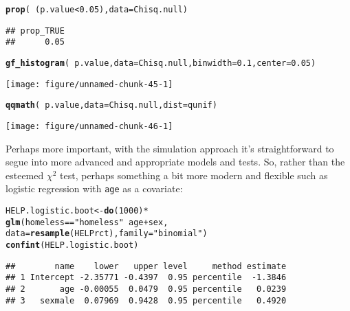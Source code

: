 \documentclass[11pt]{article}\usepackage[]{graphicx}\usepackage[]{color}
\makeatletter
\def\maxwidth{ %
  \ifdim\Gin@nat@width>\linewidth
    \linewidth
  \else
    \Gin@nat@width
  \fi
}
\newcommand{\hlnum}[1]{\textcolor[rgb]{0.686,0.059,0.569}{#1}}%
\newcommand{\hlstr}[1]{\textcolor[rgb]{0.192,0.494,0.8}{#1}}%
\newcommand{\hlopt}[1]{\textcolor[rgb]{0,0,0}{#1}}%
\newcommand{\hlstd}[1]{\textcolor[rgb]{0.345,0.345,0.345}{#1}}%
\newcommand{\hlkwb}[1]{\textcolor[rgb]{0.69,0.353,0.396}{#1}}%
\newcommand{\hlkwc}[1]{\textcolor[rgb]{0.333,0.667,0.333}{#1}}%
\newcommand{\hlkwd}[1]{\textcolor[rgb]{0.737,0.353,0.396}{\textbf{#1}}}%
\newenvironment{kframe}{%
 \def\at@end@of@kframe{}%
 \ifinner\ifhmode%
  \def\at@end@of@kframe{\end{minipage}}%
  \begin{minipage}{\columnwidth}%
 \fi\fi%
 \def\FrameCommand##1{\hskip\@totalleftmargin \hskip-\fboxsep
 \colorbox{shadecolor}{##1}\hskip-\fboxsep
     \hskip-\linewidth \hskip-\@totalleftmargin \hskip\columnwidth}%
 \MakeFramed {\advance\hsize-\width
   \@totalleftmargin\z@ \linewidth\hsize
   \@setminipage}}%
 {\par\unskip\endMakeFramed%
 \at@end@of@kframe}
\newenvironment{knitrout}{}{} %
\makeatother
\begin{document}
\begin{knitrout}
\color{fgcolor}\begin{kframe}
\begin{alltt}
\hlkwd{prop}\hlstd{(}\hlopt{~} \hlstd{(p.value} \hlopt{<} \hlnum{0.05}\hlstd{),} \hlkwc{data} \hlstd{= Chisq.null)}
\end{alltt}
\begin{verbatim}
## prop_TRUE 
##      0.05
\end{verbatim}
\begin{alltt}
\hlkwd{gf_histogram}\hlstd{(}\hlopt{~} \hlstd{p.value,} \hlkwc{data} \hlstd{= Chisq.null,} \hlkwc{binwidth} \hlstd{=} \hlnum{0.1}\hlstd{,} \hlkwc{center} \hlstd{=} \hlnum{0.05}\hlstd{)}
\end{alltt}
\end{kframe}

{\centering \texttt{[image: figure/unnamed-chunk-45-1]} 

}



\end{knitrout}
\begin{knitrout}
\color{fgcolor}\begin{kframe}
\begin{alltt}
\hlkwd{qqmath}\hlstd{(}\hlopt{~} \hlstd{p.value,} \hlkwc{data} \hlstd{= Chisq.null,} \hlkwc{dist} \hlstd{= qunif)}
\end{alltt}
\end{kframe}

{\centering \texttt{[image: figure/unnamed-chunk-46-1]} 

}



\end{knitrout}

Perhaps more important, with the simulation approach it's straightforward to segue into more advanced and appropriate models and tests.  So, rather than the esteemed $\chi^2$ test, perhaps something a bit more modern and flexible such as logistic regression with \texttt{age} as a covariate:
\begin{knitrout}
\color{fgcolor}\begin{kframe}
\begin{alltt}
\hlstd{HELP.logistic.boot} \hlkwb{<-} \hlkwd{do}\hlstd{(}\hlnum{1000}\hlstd{)} \hlopt{*}
   \hlkwd{glm}\hlstd{(homeless}\hlopt{==}\hlstr{"homeless"} \hlopt{~} \hlstd{age} \hlopt{+} \hlstd{sex,}
     \hlkwc{data} \hlstd{=} \hlkwd{resample}\hlstd{(HELPrct),} \hlkwc{family} \hlstd{=} \hlstr{"binomial"}\hlstd{)}
\hlkwd{confint}\hlstd{(HELP.logistic.boot)}
\end{alltt}
\begin{verbatim}
##        name    lower   upper level     method estimate
## 1 Intercept -2.35771 -0.4397  0.95 percentile  -1.3846
## 2       age -0.00055  0.0479  0.95 percentile   0.0239
## 3   sexmale  0.07969  0.9428  0.95 percentile   0.4920
\end{verbatim}
\end{kframe}
\end{knitrout}
\end{document}
